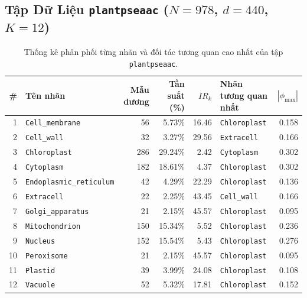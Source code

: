 \documentclass[11pt,a4paper]{article}
\begin{document}
\subsection{Tập Dữ Liệu \texttt{plantpseaac} ($N=978$, $d=440$, $K=12$)}
\begin{table}[htbp]
\centering
\footnotesize
\caption{Thống kê phân phối từng nhãn và đối tác tương quan cao nhất của tập \texttt{plantpseaac}.}
\begin{tabularx}{0.95\textwidth}{r l r r r l r}
\toprule
\textbf{\#} & \textbf{Tên nhãn} & \textbf{Mẫu dương} & \textbf{Tần suất (\%)} & \textbf{$IR_k$} & \textbf{Nhãn tương quan nhất} & \textbf{$|\phi_{\max}|$} \\
\midrule
1 & \texttt{Cell\_membrane} & 56 & 5.73\% & 16.46 & \texttt{Chloroplast} & 0.158 \\
2 & \texttt{Cell\_wall} & 32 & 3.27\% & 29.56 & \texttt{Extracell} & 0.166 \\
3 & \texttt{Chloroplast} & 286 & 29.24\% & 2.42 & \texttt{Cytoplasm} & 0.302 \\
4 & \texttt{Cytoplasm} & 182 & 18.61\% & 4.37 & \texttt{Chloroplast} & 0.302 \\
5 & \texttt{Endoplasmic\_reticulum} & 42 & 4.29\% & 22.29 & \texttt{Chloroplast} & 0.136 \\
6 & \texttt{Extracell} & 22 & 2.25\% & 43.45 & \texttt{Cell\_wall} & 0.166 \\
7 & \texttt{Golgi\_apparatus} & 21 & 2.15\% & 45.57 & \texttt{Chloroplast} & 0.095 \\
8 & \texttt{Mitochondrion} & 150 & 15.34\% & 5.52 & \texttt{Chloroplast} & 0.236 \\
9 & \texttt{Nucleus} & 152 & 15.54\% & 5.43 & \texttt{Chloroplast} & 0.276 \\
10 & \texttt{Peroxisome} & 21 & 2.15\% & 45.57 & \texttt{Chloroplast} & 0.095 \\
11 & \texttt{Plastid} & 39 & 3.99\% & 24.08 & \texttt{Chloroplast} & 0.108 \\
12 & \texttt{Vacuole} & 52 & 5.32\% & 17.81 & \texttt{Chloroplast} & 0.152 \\
\bottomrule
\end{tabularx}
\end{table}
\end{document}
